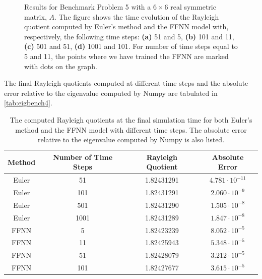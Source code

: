 \begin{figure}[H]
\qquad
{}
\caption{Results for Benchmark Problem 5 with a $6\times 6$ real symmetric matrix, $A$. The figure shows the time evolution of the Rayleigh quotient computed by Euler's method and the FFNN model with, respectively, the following time steps: \textbf{(a)} 51 and 5, \textbf{(b)} 101 and 11, \textbf{(c)} 501 and 51, \textbf{(d)} 1001 and 101. For number of time steps equal to 5 and 11, the points where we have trained the FFNN are marked with dots on the graph.}
\label{fig:benchrun4}
\end{figure}

The final Rayleigh quotients computed at different time steps and the absolute error relative to the eigenvalue computed by Numpy are tabulated in \autoref{tab:eigbench4}.

\begin{table}[H]
\caption{The computed Rayleigh quotients at the final simulation time for both Euler's method and the FFNN model with different time steps. The absolute error relative to the eigenvalue computed by Numpy is also listed.}
\centering
{}
\begin{tabular}{c|c|c|c}
\hline
\hline 
Method & Number of Time Steps & Rayleigh Quotient & Absolute Error
\\
\hline 
\hline 
Euler & 51 & 1.82431291 & $4.781\cdot10^{-11}$
\\
Euler & 101 & 1.82431291 & $2.060\cdot10^{-9}$
\\
Euler & 501 & 1.82431290 & $1.505\cdot10^{-8}$
\\
Euler & 1001 & 1.82431289 & $1.847 \cdot10^{-8}$
\\
FFNN & 5 & 1.82423239 & $8.052\cdot10^{-5}$
\\
FFNN & 11 & 1.82425943 & $5.348\cdot10^{-5}$
\\
FFNN & 51 & 1.82428079 & $3.212\cdot10^{-5}$
\\
FFNN & 101 & 1.82427677 & $3.615\cdot10^{-5}$
\\
\hline
\hline 
\end{tabular}
\label{tab:eigbench4}
\end{table}

